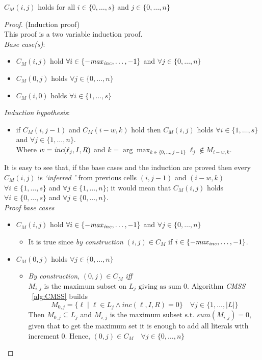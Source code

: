 \begin{theorem}
    \label{thereom:inductive:cmin}
    $C_M(i,j)$ holds for all $i \in \{0, \hdots, s\}$
    and $j \in \{0, \hdots, n\}$
\end{theorem}

\begin{proof}(Induction proof)\\
   This proof is a two variable induction proof.\\
   \textit{Base case(s)}:
   \begin{itemize}
        \item $C_M(i,j)$ hold $\forall i \in \{-\mathit{max}_{\mathit{inc}}, \hdots, -1\}$ and $\forall j \in \{0, \hdots, n\}$ 
        \item $C_M(0,j)$ holds $\forall j \in \{0, \hdots, n\}$ 
        \item $C_M(i,0)$ holds $\forall i \in \{1, \hdots, s\}$
   \end{itemize}
   \textit{Induction hypothesis}:
   \begin{itemize}
        \item if $C_M(i,j-1)$ and $C_M(i-w,k)$ hold then $C_M(i,j)$ holds $\forall i \in \{1,\hdots,s\}$
        and $\forall j \in \{1, \hdots, n\}$.
        \\ Where $w = \mathit{inc}(\ell_j,I,R)$ and $k = \arg \max_{k \in \{0,\hdots,j-1\}} \ell_j \not\in M_{i-w,k}$.
   \end{itemize}
   It is easy to see that, if the base cases  and the induction are proved then 
   every $C_M(i,j)$ is \textit{`inferred '} from previous cells $(i,j-1)$ and $(i-w,k)$ 
   $\forall i \in \{1,\hdots,s\}$ and $\forall j \in \{1, \hdots, n\}$;
   it would mean that $C_M(i,j)$ holds $\forall i \in \{0,\hdots,s\}$ and $\forall j \in \{0, \hdots, n\}$.\\
   \textit{Proof base cases}
   \begin{itemize}
    \item $C_M(i,j)$ hold $\forall i \in \{-\mathit{max}_{\mathit{inc}}, \hdots, -1\}$ and $\forall j \in \{0, \hdots, n\}$ 
    \begin{itemize}
        \item It is true since \textit{by construction} $(i,j) \in C_M$ if $i \in \{-\mathit{max}_{\mathit{inc}}, \hdots, -1\}$.
    \end{itemize}
    \item $C_M(0,j)$ holds $\forall j \in \{0, \hdots, n\}$ 
    \begin{itemize}
        \item \textit{By construction}, $(0,j) \in C_M$ \textit{iff}
        $M_{i,j} \text{ is the maximum subset on } L_j \text{ giving as sum } 0$.
        Algorithm \textit{CMSS} ~\eqref{alg:CMSS} builds 
        $$M_{0,j} = \{ \ell \mid \ell \in L_j \land inc(\ell,I,R) = 0\} \quad \forall j \in \{1, \hdots , |L|\}$$
        Then $M_{0,j} \subseteq L_j$ and
        $M_{i,j} \text{ is the maximum subset s.t. } \mathit{sum}(M_{i,j}) = 0$,
        given that to get the maximum set it is enough to add all literals with increment 0.
        Hence, $(0,j) \in C_M \quad \forall j \in \{0, \hdots, n\}$ 


\end{itemize}
\end{itemize}
\end{proof}
